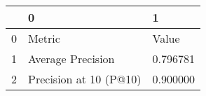 \begin{tabular}{lll}
\toprule
 & 0 & 1 \\
\midrule
0 & Metric & Value \\
1 & Average Precision & 0.796781 \\
2 & Precision at 10 (P@10) & 0.900000 \\
\bottomrule
\end{tabular}
